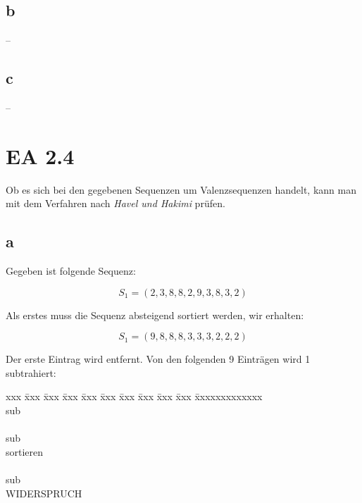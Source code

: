 \documentclass[12pt]{article}
\begin{document}
\subsection*{b}
--

\subsection*{c}
--

\section*{EA 2.4}
Ob es sich bei den gegebenen Sequenzen um Valenzsequenzen handelt, kann man mit dem
Verfahren nach \textit{Havel und Hakimi} prüfen. 
\subsection*{a}
Gegeben ist folgende Sequenz:

\begin{equation*}
S_1 = (2, 3, 8, 8, 2, 9, 3, 8, 3, 2)
\end{equation*}

Als erstes muss die Sequenz absteigend sortiert werden, wir erhalten:

\begin{equation*}
S_1 = (9, 8, 8, 8, 3, 3, 3, 2, 2, 2)
\end{equation*}

Der erste Eintrag wird entfernt. Von den folgenden 9 Einträgen wird 1 subtrahiert:


\begin{tabbing}
xxx \= xxx \= xxx \= xxx \= xxx \= xxx \= xxx \= xxx \= xxx \= xxx \= xxxxxxxxxxxxx                              \\
                      \> sub\\
                               \\
    \>                     \> sub\\
    \>                             \> sortieren \\
    \>                             \>  \\
    \>     \>                    \> sub\\
    \>     \>                         \> WIDERSPRUCH
 \end{tabbing}
\end{document}
